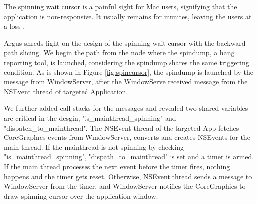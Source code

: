 The spinning wait cursor is a painful sight for Mac users, signifying that the application is non-responsive.
It usually remains for munites, leaving the users at a loss .                    

Argus shreds light on the design of the spinning wait cursor with the backward path slicing.
We begin the path from the node where the spindump, a hang reporting tool, is launched,  
considering the spindump shares the same triggering condition.
As is shown in Figure \ref{fig:spincursor}, the spindump is launched by the message from WindowServer, after the WindowServe received message from the NSEvent thread of targeted Application.

We further added call stacks for the messages and revealed two shared variables are critical in the desgin, "is\_mainthread\_spinning" and "dispatch\_to\_mainthread".
The NSEvent thread of the targeted App fetches CoreGraphics events from WindowServer, converts and creates NSEvents for the main thread.
If the mainthread is not spinning by checking "is\_mainthread\_spinning", "dispath\_to\_mainthread" is set and a timer is armed.
If the main thread processes the next event before the timer fires, nothing happens and the timer gets reset.
Otherwise, NSEvent thread sends a message to WindowServer from the timer,
and WindowServer notifies the CoreGraphics to draw spinning cursor over the application window.
